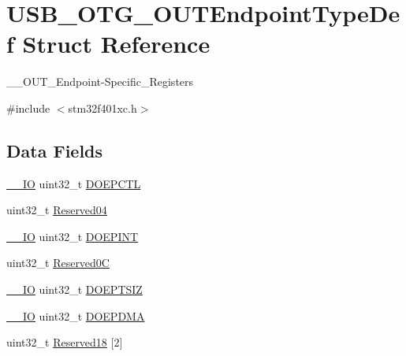 \hypertarget{struct_u_s_b___o_t_g___o_u_t_endpoint_type_def}{}\section{U\+S\+B\+\_\+\+O\+T\+G\+\_\+\+O\+U\+T\+Endpoint\+Type\+Def Struct Reference}
\label{struct_u_s_b___o_t_g___o_u_t_endpoint_type_def}


\+\_\+\+\_\+\+O\+U\+T\+\_\+\+Endpoint-\/\+Specific\+\_\+\+Registers  




{\ttfamily \#include $<$stm32f401xc.\+h$>$}

\subsection*{Data Fields}
\begin{DoxyCompactItemize}
\item 
\hyperlink{core__sc300_8h_aec43007d9998a0a0e01faede4133d6be}{\+\_\+\+\_\+\+IO} uint32\+\_\+t \hyperlink{struct_u_s_b___o_t_g___o_u_t_endpoint_type_def_a905a2b4ece4882eb67c710e0db10e960}{D\+O\+E\+P\+C\+TL}
\item 
uint32\+\_\+t \hyperlink{struct_u_s_b___o_t_g___o_u_t_endpoint_type_def_acfe7efaa61db86840767dff6d73f8695}{Reserved04}
\item 
\hyperlink{core__sc300_8h_aec43007d9998a0a0e01faede4133d6be}{\+\_\+\+\_\+\+IO} uint32\+\_\+t \hyperlink{struct_u_s_b___o_t_g___o_u_t_endpoint_type_def_affd2c6f534c8f2c252f3a93d0cd04ea2}{D\+O\+E\+P\+I\+NT}
\item 
uint32\+\_\+t \hyperlink{struct_u_s_b___o_t_g___o_u_t_endpoint_type_def_a1bcc039378b4ed4ac1261a0a758c3d1d}{Reserved0C}
\item 
\hyperlink{core__sc300_8h_aec43007d9998a0a0e01faede4133d6be}{\+\_\+\+\_\+\+IO} uint32\+\_\+t \hyperlink{struct_u_s_b___o_t_g___o_u_t_endpoint_type_def_a35b668314acbac2580b98caf8b9c5c10}{D\+O\+E\+P\+T\+S\+IZ}
\item 
\hyperlink{core__sc300_8h_aec43007d9998a0a0e01faede4133d6be}{\+\_\+\+\_\+\+IO} uint32\+\_\+t \hyperlink{struct_u_s_b___o_t_g___o_u_t_endpoint_type_def_a78a4f036f29e552acad6a442fbb69420}{D\+O\+E\+P\+D\+MA}
\item 
uint32\+\_\+t \hyperlink{struct_u_s_b___o_t_g___o_u_t_endpoint_type_def_a98a4d649c554bb2c4ff0b6f36e9ce9f5}{Reserved18} \mbox{[}2\mbox{]}
\end{DoxyCompactItemize}


